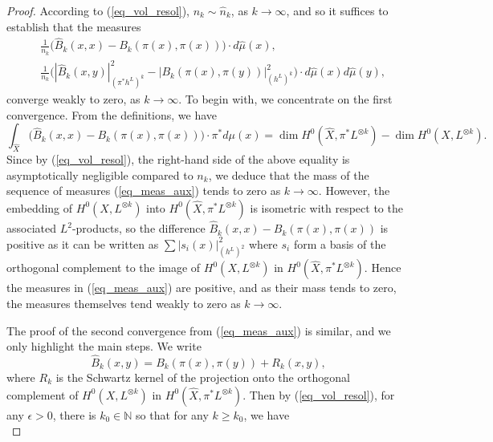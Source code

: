 \documentclass[12pt]{article}
\numberwithin{equation}{section}
\theoremstyle{theorem}
\theoremstyle{definition}
\theoremstyle{remark}
\newcommand{\nat}{\mathbb{N}}
\begin{document}
	\begin{proof}
		According to (\ref{eq_vol_resol}), $n_k \sim \hat{n}_k$, as $k \to \infty$, and so it suffices to establish that the measures
		\begin{equation}\label{eq_meas_aux}
		\begin{aligned}
			&
			\frac{1}{n_k} \Big( \hat{B}_k(x, x) - B_k(\pi(x), \pi(x)) \Big) \cdot d \hat{\mu}(x),
			\\
			&
			\frac{1}{n_k} \Big( |\hat{B}_k(x, y)|^2_{(\pi^* h^L)^k} - |B_k(\pi(x), \pi(y))|^2_{(h^L)^k} \Big) \cdot d \hat{\mu}(x) d \hat{\mu}(y),
		\end{aligned}
		\end{equation}
		converge weakly to zero, as $k \to \infty$.
		To begin with, we concentrate on the first convergence.
		From the definitions, we have 
		\begin{equation}
			\int_{\hat{X}}  \Big( \hat{B}_k(x, x) - B_k(\pi(x), \pi(x)) \Big) \cdot \pi^* d \mu(x)
			=
			\dim H^0(\hat{X}, \pi^* L^{\otimes k})
			-
			\dim H^0(X, L^{\otimes k}).
		\end{equation}
		Since by (\ref{eq_vol_resol}), the right-hand side of the above equality is asymptotically negligible compared to $n_k$, we deduce that the mass of the sequence of measures (\ref{eq_meas_aux}) tends to zero as $k \to \infty$.  
		However, the embedding of $H^0(X, L^{\otimes k})$ into $H^0(\hat{X}, \pi^* L^{\otimes k})$ is isometric with respect to the associated $L^2$-products, so the difference $\hat{B}_k(x, x) - B_k(\pi(x), \pi(x))$ is positive as it can be written as $\sum |s_i(x)|^2_{(h^L)^2}$ where $s_i$ form a basis of the orthogonal complement to the image of $H^0(X, L^{\otimes k})$ in $H^0(\hat{X}, \pi^* L^{\otimes k})$. 
		Hence the measures in (\ref{eq_meas_aux}) are positive, and as their mass tends to zero, the measures themselves tend weakly to zero as $k \to \infty$.
		\par 
		The proof of the second convergence from (\ref{eq_meas_aux}) is similar, and we only highlight the main steps. 
		We write 
		\begin{equation}
			\hat{B}_k(x, y) 
			=
			B_k(\pi(x), \pi(y))
			+
			R_k(x, y),
		\end{equation}
		where $R_k$ is the Schwartz kernel of the projection onto the orthogonal complement of $H^0(X, L^{\otimes k})$ in $H^0(\hat{X}, \pi^* L^{\otimes k})$.
		Then by (\ref{eq_vol_resol}), for any $\epsilon > 0$, there is $k_0 \in \nat$ so that for any $k \geq k_0$, we have 
		\begin{equation}

\end{equation}
\end{proof}
\end{document}
